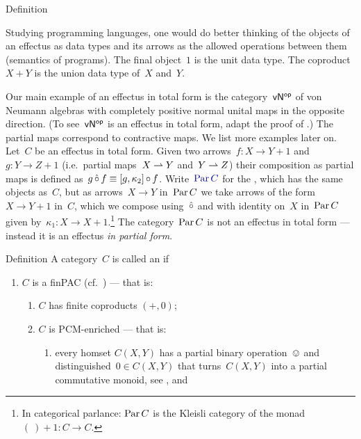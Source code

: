 \documentclass[b]{subfiles}
\begin{document}
\begin{parsec}
\begin{point}{Definition}
\begin{point}
Studying programming languages, one would do better thinking of
    the objects of an effectus as data types and
    its arrows as the allowed operations between them (semantics of programs).
The final object~$1$ is the unit data type.
The coproduct~$X + Y$ is the union data type of~$X$ and~$Y$.
\end{point}
\begin{point}%
Our main example of an effectus in total form
    is the category~${\mathsf{vN}}{^{\mathsf{op}}}$
    of von Neumann algebras with completely positive normal unital
    maps in the opposite direction.
(To see~${\mathsf{vN}}{^{\mathsf{op}}}$ is an effectus in total form,
    adapt the proof of .)
The partial maps correspond to contractive maps.
We list more examples later on.
Let~$C$ be an effectus in total form.
Given two arrows~$f\colon X \to Y+1$
and~$g \colon Y \to Z+1$ (i.e.~partial maps~$X \rightharpoonup Y$ and~$Y \rightharpoonup Z$)
    their composition as partial maps
    is defined as~$g \mathop{\hat\circ} f \equiv  [g, \kappa_2] \mathop{\circ} f$.
Write~$\Define{\Par C}$ for the ,
    which has the same objects
    as~$C$, but as arrows~$X \to Y$ in~$\operatorname{Par} C$
    we take arrows of the form~$X \to Y+1$ in~$C$,
    which we compose using~$\mathop{\hat\circ}$
    and with identity on~$X$ in~$\operatorname{Par} C$
    given by~$\kappa_1 \colon X \to X+1$.\footnote{In categorical
            parlance: $\operatorname{Par} C$ is the Kleisli category of
            the monad~$(\ )+1\colon C \to C$.}
The category~$\operatorname{Par} C$ is not an effectus in total form --- instead it
    is an effectus \emph{in partial form}.
\end{point}
\end{point}
\begin{point}{Definition}%
A category~$C$ is called an 
    \cite{effintro,kentapartial} if
\begin{enumerate}
\item
    $C$ is a finPAC \cite{kentapartial} (cf.~\cite{arbib}) --- that is:
    \begin{enumerate}
        \item 
            $C$ has finite coproducts $(+,0)$;
        \item $C$ is PCM-enriched --- that is:
            \begin{enumerate}
            \item
            every homset $C(X,Y)$ has a partial binary operation~$\ovee$
                    and distinguished~$0 \in C(X,Y)$
                    that turns~$C(X,Y)$ into a partial commutative monoid,
                    see , and

\end{enumerate}
\end{enumerate}
\end{enumerate}
\end{point}
\end{parsec}
\end{document}
